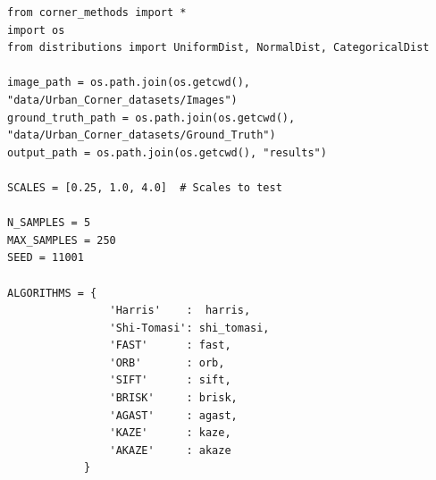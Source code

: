 \documentclass[journal]{IEEEtran}
\begin{document}
\begin{lstlisting}[style=python, caption={Setup Parameters}, label={lst:params}]
from corner_methods import *
import os
from distributions import UniformDist, NormalDist, CategoricalDist

image_path = os.path.join(os.getcwd(), "data/Urban_Corner_datasets/Images")
ground_truth_path = os.path.join(os.getcwd(), "data/Urban_Corner_datasets/Ground_Truth")
output_path = os.path.join(os.getcwd(), "results")

SCALES = [0.25, 1.0, 4.0]  # Scales to test

N_SAMPLES = 5
MAX_SAMPLES = 250
SEED = 11001

ALGORITHMS = {
                'Harris'    :  harris,
                'Shi-Tomasi': shi_tomasi,
                'FAST'      : fast,
                'ORB'       : orb,
                'SIFT'      : sift,
                'BRISK'     : brisk,
                'AGAST'     : agast,
                'KAZE'      : kaze,
                'AKAZE'     : akaze
            }


\end{lstlisting}
\end{document}
